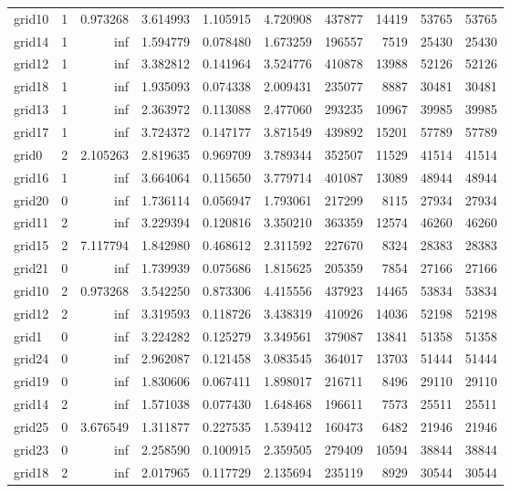 \begin{longtable}{|l|r|r|r|r|r|r|r|r|r|}
grid10 & 1 & 0.973268 & 3.614993 & 1.105915 & 4.720908 & 437877 & 14419 & 53765 & 53765 \\
grid14 & 1 & inf & 1.594779 & 0.078480 & 1.673259 & 196557 & 7519 & 25430 & 25430 \\
grid12 & 1 & inf & 3.382812 & 0.141964 & 3.524776 & 410878 & 13988 & 52126 & 52126 \\
grid18 & 1 & inf & 1.935093 & 0.074338 & 2.009431 & 235077 & 8887 & 30481 & 30481 \\
grid13 & 1 & inf & 2.363972 & 0.113088 & 2.477060 & 293235 & 10967 & 39985 & 39985 \\
grid17 & 1 & inf & 3.724372 & 0.147177 & 3.871549 & 439892 & 15201 & 57789 & 57789 \\
grid0 & 2 & 2.105263 & 2.819635 & 0.969709 & 3.789344 & 352507 & 11529 & 41514 & 41514 \\
grid16 & 1 & inf & 3.664064 & 0.115650 & 3.779714 & 401087 & 13089 & 48944 & 48944 \\
grid20 & 0 & inf & 1.736114 & 0.056947 & 1.793061 & 217299 & 8115 & 27934 & 27934 \\
grid11 & 2 & inf & 3.229394 & 0.120816 & 3.350210 & 363359 & 12574 & 46260 & 46260 \\
grid15 & 2 & 7.117794 & 1.842980 & 0.468612 & 2.311592 & 227670 & 8324 & 28383 & 28383 \\
grid21 & 0 & inf & 1.739939 & 0.075686 & 1.815625 & 205359 & 7854 & 27166 & 27166 \\
grid10 & 2 & 0.973268 & 3.542250 & 0.873306 & 4.415556 & 437923 & 14465 & 53834 & 53834 \\
grid12 & 2 & inf & 3.319593 & 0.118726 & 3.438319 & 410926 & 14036 & 52198 & 52198 \\
grid1 & 0 & inf & 3.224282 & 0.125279 & 3.349561 & 379087 & 13841 & 51358 & 51358 \\
grid24 & 0 & inf & 2.962087 & 0.121458 & 3.083545 & 364017 & 13703 & 51444 & 51444 \\
grid19 & 0 & inf & 1.830606 & 0.067411 & 1.898017 & 216711 & 8496 & 29110 & 29110 \\
grid14 & 2 & inf & 1.571038 & 0.077430 & 1.648468 & 196611 & 7573 & 25511 & 25511 \\
grid25 & 0 & 3.676549 & 1.311877 & 0.227535 & 1.539412 & 160473 & 6482 & 21946 & 21946 \\
grid23 & 0 & inf & 2.258590 & 0.100915 & 2.359505 & 279409 & 10594 & 38844 & 38844 \\
grid18 & 2 & inf & 2.017965 & 0.117729 & 2.135694 & 235119 & 8929 & 30544 & 30544 \\

\end{longtable}
